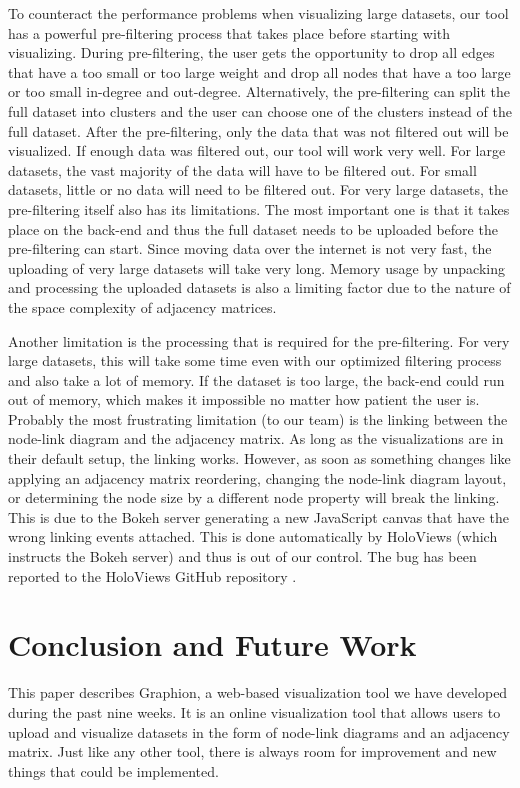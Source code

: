 \documentclass[journal]{vgtc}                %
\begin{document}
To counteract the performance problems when visualizing large datasets, our tool has a powerful pre-filtering process that takes place before starting with visualizing. During pre-filtering, the user gets the opportunity to drop all edges that have a too small or too large weight and drop all nodes that have a too large or too small in-degree and out-degree. Alternatively, the pre-filtering can split the full dataset into clusters and the user can choose one of the clusters instead of the full dataset.
After the pre-filtering, only the data that was not filtered out will be visualized. If enough data was filtered out, our tool will work very well. For large datasets, the vast majority of the data will have to be filtered out. For small datasets, little or no data will need to be filtered out.
For very large datasets, the pre-filtering itself also has its limitations. The most important one is that it takes place on the back-end and thus the full dataset needs to be uploaded before the pre-filtering can start. Since moving data over the internet is not very fast, the uploading of very large datasets will take very long. Memory usage by unpacking and processing the uploaded datasets is also a limiting factor due to the nature of the space complexity of adjacency matrices.

Another limitation is the processing that is required for the pre-filtering. For very large datasets, this will take some time even with our optimized filtering process and also take a lot of memory. If the dataset is too large, the back-end could run out of memory, which makes it impossible no matter how patient the user is.
Probably the most frustrating limitation (to our team) is the linking between the node-link diagram and the adjacency matrix. As long as the visualizations are in their default setup, the linking works. However, as soon as something changes like applying an adjacency matrix reordering, changing the node-link diagram layout, or determining the node size by a different node property will break the linking. This is due to the Bokeh server generating a new JavaScript canvas that have the wrong linking events attached. This is done automatically by HoloViews (which instructs the Bokeh server) and thus is out of our control. The bug has been reported to the HoloViews GitHub repository \cite{Broek:2019}.

\section{Conclusion and Future Work} %
This paper describes Graphion, a web-based visualization tool we have developed during the past nine weeks. It is an online visualization tool that allows users to upload and visualize datasets in the form of node-link diagrams and an adjacency matrix.
Just like any other tool, there is always room for improvement and new things that could be implemented.
\end{document}
